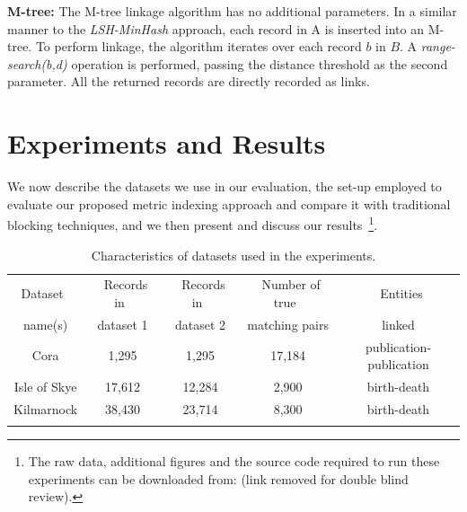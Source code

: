 \documentclass{llncs}
\begin{document}
\textbf{M-tree:} The M-tree linkage algorithm has no additional
parameters. In a similar manner to the \emph{LSH-MinHash} approach, each
record in A is inserted into an M-tree. To perform linkage, the
algorithm iterates over each record $b$ in $B$. A \emph{range-search(b,d)}
operation is performed, passing the distance threshold as the second
parameter. All the returned records are directly recorded as links.


\section{Experiments and Results}
\label{sec-exp}

We now describe the datasets we use in our evaluation, the set-up
employed to evaluate our proposed metric indexing approach and compare
it with traditional blocking techniques, and we then present and discuss
our results~\footnote{The raw data, additional figures and the source
code required to run these experiments can be downloaded from:
(link removed for double blind review).}.


\begin{table}[t]
\caption{Characteristics of datasets used in the experiments.}
 \label{table-datasets}
  \centering
  \begin{scriptsize}
  \begin{tabular}{ccccc}
  \hline\noalign{\smallskip}
  Dataset~ & ~Records in~& ~Records in~ & ~Number of true~& ~Entities\\
  name(s)  & dataset 1  & dataset 2  & matching pairs & linked \\
  \noalign{\smallskip} \hline \noalign{\smallskip}
  Cora & 1,295 & 1,295 & 17,184 & publication-publication\\
  Isle of Skye & 17,612 & 12,284& 2,900 & birth-death\\
  Kilmarnock & 38,430 & 23,714 & 8,300 & birth-death\\
  \noalign{\smallskip} \hline
  \end{tabular}
  \end{scriptsize}
\end{table}

\end{document}
